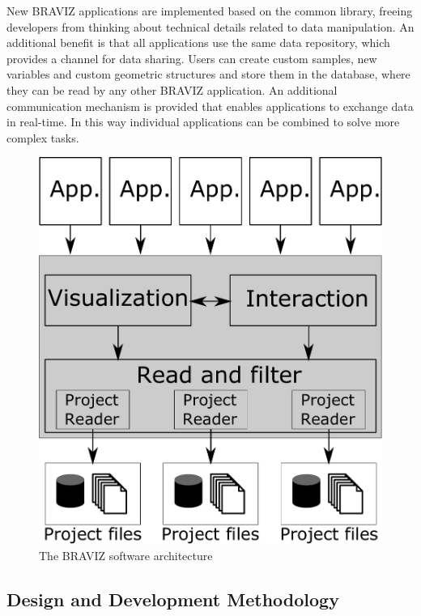 \documentclass[twocolumn]{svjour3}
\begin{document}
New BRAVIZ applications are implemented based on the common library, freeing developers from thinking about technical details related to data manipulation. An additional benefit is that all applications use the same data repository, which provides a channel for data sharing. Users can create custom samples, new variables and custom geometric structures and store them in the database, where they can be read by any other BRAVIZ application. An additional communication mechanism is provided that enables applications to exchange data in real-time. In this way individual applications can be combined to solve more complex tasks.

\begin{figure}
\begin{center}
\includegraphics[width=0.6\linewidth]{arquitecture.pdf}
\end{center}
 \caption{\label{fig_arch} The BRAVIZ software architecture}
\end{figure}


\subsection{Design and Development Methodology}
\end{document}
